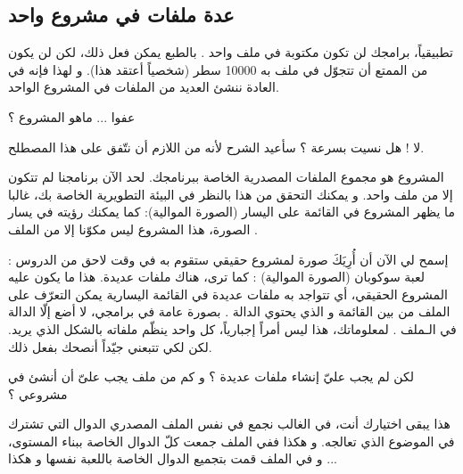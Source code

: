 \subsection{عدة ملفات في مشروع واحد}
تطبيقياً، برامجك لن تكون مكتوبة في ملف واحد
.
بالطبع يمكن فعل ذلك، لكن لن يكون من الممتع أن تتجوّل في ملف به 10000 سطر (شخصياً أعتقد هذا). و لهذا فإنه في العادة ننشئ العديد من الملفات في المشروع الواحد.
\begin{question}
  عفوا ... ماهو المشروع ؟
\end{question}
لا ! هل نسيت بسرعة ؟ سأعيد الشرح لأنه من اللازم أن نتّفق على هذا المصطلح.

المشروع هو مجموع الملفات المصدرية الخاصة ببرنامجك. لحد الآن برنامجنا لم تتكون إلا من ملف واحد. و يمكنك التحقق من هذا بالنظر في البيئة التطويرية الخاصة بك، غالبا ما يظهر المشروع في القائمة على اليسار (الصورة الموالية):
كما يمكنك رؤيته في يسار الصورة، هذا المشروع ليس مكوّنا إلا من الملف
.

إسمح لي الآن أن أُرِيَكَ صورة لمشروع حقيقي ستقوم به في وقت لاحق من الدروس : لعبة سوكوبان (الصورة الموالية) :
كما ترى، هناك ملفات عديدة. هذا ما يكون عليه المشروع الحقيقي، أي تتواجد به ملفات عديدة في القائمة اليسارية  يمكن التعرّف على الملف
من بين القائمة و الذي يحتوي الدالة
.
بصورة عامة في برامجي، لا أضع إلّا الدالة
في الـملف
.
لمعلوماتك، هذا ليس أمراً إجبارياً، كل واحد ينظّم ملفاته بالشكل الذي يريد. لكن لكي تتبعني جيّداً أنصحك بفعل ذلك.
\begin{question}
  لكن لم يجب عليّ إنشاء ملفات عديدة ؟ و كم من ملف يجب علىّ أن أنشئ في مشروعي ؟
\end{question}
هذا يبقى اختيارك أنت، في الغالب نجمع في نفس الملف المصدري الدوال التي تشترك في الموضوع الذي تعالجه. و هكذا ففي الملف
جمعت كلّ الدوال الخاصة ببناء المستوى، و في الملف
قمت بتجميع الدوال الخاصة باللعبة نفسها و هكذا ...
